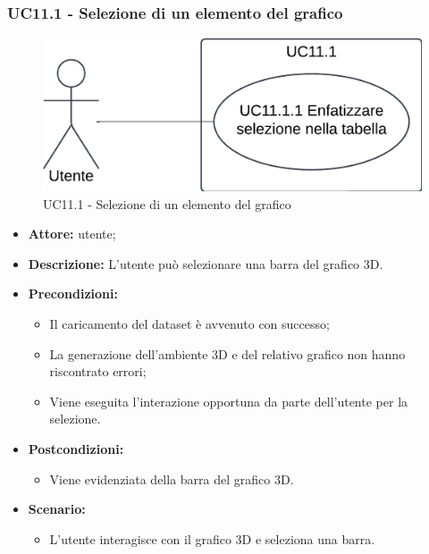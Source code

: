 \pagebreak

\subsubsection{UC11.1 - Selezione di un elemento del grafico}
\begin{figure}[h!]\centering
    \includegraphics[scale=0.7]{template/images/UC11.1.png}
    \caption{UC11.1 - Selezione di un elemento del grafico}
\end{figure}
\begin{itemize}    
    \item \textbf{Attore:} utente;
    \item \textbf{Descrizione:} L'utente può selezionare una barra del grafico 3D.
    \item \textbf{Precondizioni:}    
        \begin{itemize}
            \item Il caricamento del dataset è avvenuto con successo;
            \item La generazione dell'ambiente 3D e del relativo grafico non hanno riscontrato errori;
            \item Viene eseguita l'interazione opportuna da parte dell'utente per la selezione.
        \end{itemize}    
    \item \textbf{Postcondizioni:}
        \begin{itemize}
            \item Viene evidenziata della barra del grafico 3D.
        \end{itemize}    
    \item \textbf{Scenario:} 
        \begin{itemize}
            \item L'utente interagisce con il grafico 3D e seleziona una barra.
        \end{itemize}
\end{itemize}
